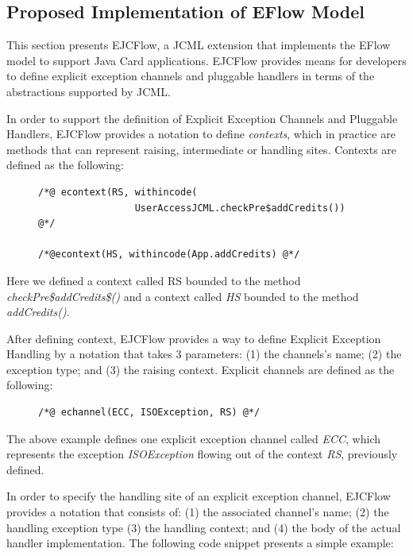 \documentclass[10pt, conference, compsocconf]{IEEEtran}
\begin{document}
\subsection{Proposed Implementation of EFlow Model}
\label{subsec:limitEflow}

This section presents EJCFlow, a JCML extension that implements the EFlow model
to support Java Card applications. EJCFlow provides means for developers to
define explicit exception channels and pluggable handlers in terms of the
abstractions supported by JCML.  

In order to support the definition of Explicit Exception Channels and Pluggable
Handlers, EJCFlow provides a notation to define \textit{contexts}, which in
practice are methods that can represent raising, intermediate or handling sites. Contexts are
defined as the following:  

\begin{figure}[ht!]
\centering  
\scriptsize 
\begin{verbatim}
/*@ econtext(RS, withincode(
                 UserAccessJCML.checkPre$addCredits()) 
@*/ 
 
/*@econtext(HS, withincode(App.addCredits) @*/
\end{verbatim}
\end{figure}

Here we defined a context called RS bounded to the method
\textit{checkPre\$addCredits\$()} and a context called \textit{HS} bounded to
the method \textit{addCredits()}.

After defining context, EJCFlow provides a way to define Explicit Exception
Handling by a notation that takes 3 parameters: (1) the channels's name; (2) the
exception type; and (3) the raising context. Explicit channels are defined as
the following: 
 

\begin{figure}[ht!]
\centering  
\scriptsize 

\begin{verbatim}
/*@ echannel(ECC, ISOException, RS) @*/
\end{verbatim}
\end{figure}

The above example defines one explicit exception channel called \textit{ECC},
which represents the exception \textit{ISOException} flowing out of the context
\textit{RS}, previously defined. 

In order to specify the handling site of an explicit exception channel, EJCFlow
provides a notation that consists of: (1) the associated channel's name; (2) the
handling exception type (3) the handling context; and (4) the body of the actual
handler implementation. The following code snippet presents a simple example:   
\end{document}
